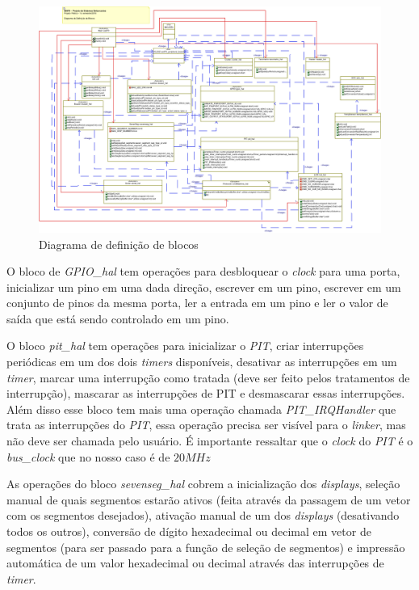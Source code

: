 \documentclass{article}
\begin{document}
\begin{figure}[H]
	\centering
	\includegraphics[width=1.5\linewidth, center]{blocos}
	\caption{Diagrama de definição de blocos}
	\label{fig:blocos}
\end{figure}

O bloco de \textit{GPIO\_hal} tem operações para desbloquear o \textit{clock} para uma porta, inicializar um pino em uma dada direção, escrever em um pino, escrever em um conjunto de pinos da mesma porta, ler a entrada em um pino e ler o valor de saída que está sendo controlado em um pino.

O bloco \textit{pit\_hal} tem operações para inicializar o \textit{PIT}, criar interrupções periódicas em um dos dois \textit{timers} disponíveis, desativar as interrupções em um \textit{timer}, marcar uma interrupção como tratada (deve ser feito pelos tratamentos de interrupção), mascarar as interrupções de PIT e desmascarar essas interrupções. Além disso esse bloco tem mais uma operação chamada \textit{PIT\_IRQHandler }que trata as interrupções do \textit{PIT}, essa operação precisa ser visível para o \textit{linker}, mas não deve ser chamada pelo usuário. É importante ressaltar que o \textit{clock} do \textit{PIT} é o \textit{bus\_clock} que no nosso caso é de $20MHz$

As operações do bloco \textit{sevenseg\_hal} cobrem a inicialização dos \textit{displays}, seleção manual de quais segmentos estarão ativos (feita através da passagem de um vetor com os segmentos desejados), ativação manual de um dos \textit{displays} (desativando todos os outros), conversão de dígito hexadecimal ou decimal em vetor de segmentos (para ser passado para a função de seleção de segmentos) e impressão automática de um valor hexadecimal ou decimal através das interrupções de \textit{timer}.
\end{document}
